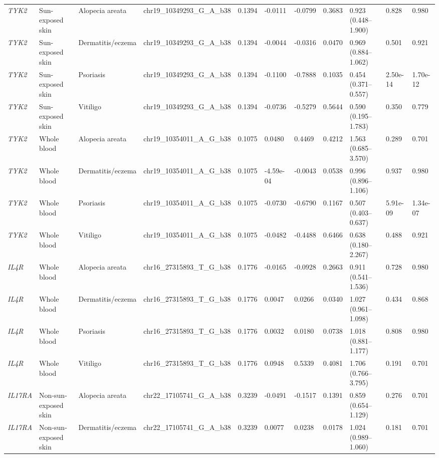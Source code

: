 \documentclass[10pt,a4paper]{article}
\begin{document}
\begin{landscape}
\begin{longtable}{p{1.5cm}p{2.7cm}p{2.5cm}p{4.2cm}p{1.5cm}p{1.5cm}p{1.5cm}p{1.4cm}p{3.4cm}p{1.8cm}p{1.8cm}}
\textit{TYK2} & Sun-exposed skin & Alopecia areata & chr19\_10349293\_G\_A\_b38 & 0.1394 & -0.0111 & -0.0799 & 0.3683 & 0.923 (0.448--1.900) & 0.828 & 0.980 \\
\textit{TYK2} & Sun-exposed skin & Dermatitis/eczema & chr19\_10349293\_G\_A\_b38 & 0.1394 & -0.0044 & -0.0316 & 0.0470 & 0.969 (0.884--1.062) & 0.501 & 0.921 \\
\textit{TYK2} & Sun-exposed skin & Psoriasis & chr19\_10349293\_G\_A\_b38 & 0.1394 & -0.1100 & -0.7888 & 0.1035 & 0.454 (0.371--0.557) & 2.50e-14 & 1.70e-12 \\
\textit{TYK2} & Sun-exposed skin & Vitiligo & chr19\_10349293\_G\_A\_b38 & 0.1394 & -0.0736 & -0.5279 & 0.5644 & 0.590 (0.195--1.783) & 0.350 & 0.779 \\
\textit{TYK2} & Whole blood & Alopecia areata & chr19\_10354011\_A\_G\_b38 & 0.1075 & 0.0480 & 0.4469 & 0.4212 & 1.563 (0.685--3.570) & 0.289 & 0.701 \\
\textit{TYK2} & Whole blood & Dermatitis/eczema & chr19\_10354011\_A\_G\_b38 & 0.1075 & -4.59e-04 & -0.0043 & 0.0538 & 0.996 (0.896--1.106) & 0.937 & 0.980 \\
\textit{TYK2} & Whole blood & Psoriasis & chr19\_10354011\_A\_G\_b38 & 0.1075 & -0.0730 & -0.6790 & 0.1167 & 0.507 (0.403--0.637) & 5.91e-09 & 1.34e-07 \\
\textit{TYK2} & Whole blood & Vitiligo & chr19\_10354011\_A\_G\_b38 & 0.1075 & -0.0482 & -0.4488 & 0.6466 & 0.638 (0.180--2.267) & 0.488 & 0.921 \\
\textit{IL4R} & Whole blood & Alopecia areata & chr16\_27315893\_T\_G\_b38 & 0.1776 & -0.0165 & -0.0928 & 0.2663 & 0.911 (0.541--1.536) & 0.728 & 0.980 \\
\textit{IL4R} & Whole blood & Dermatitis/eczema & chr16\_27315893\_T\_G\_b38 & 0.1776 & 0.0047 & 0.0266 & 0.0340 & 1.027 (0.961--1.098) & 0.434 & 0.868 \\
\textit{IL4R} & Whole blood & Psoriasis & chr16\_27315893\_T\_G\_b38 & 0.1776 & 0.0032 & 0.0180 & 0.0738 & 1.018 (0.881--1.177) & 0.808 & 0.980 \\
\textit{IL4R} & Whole blood & Vitiligo & chr16\_27315893\_T\_G\_b38 & 0.1776 & 0.0948 & 0.5339 & 0.4081 & 1.706 (0.766--3.795) & 0.191 & 0.701 \\
\textit{IL17RA} & Non-sun-exposed skin & Alopecia areata & chr22\_17105741\_G\_A\_b38 & 0.3239 & -0.0491 & -0.1517 & 0.1391 & 0.859 (0.654--1.129) & 0.276 & 0.701 \\
\textit{IL17RA} & Non-sun-exposed skin & Dermatitis/eczema & chr22\_17105741\_G\_A\_b38 & 0.3239 & 0.0077 & 0.0238 & 0.0178 & 1.024 (0.989--1.060) & 0.181 & 0.701 \\

\end{longtable}
\end{landscape}
\end{document}
